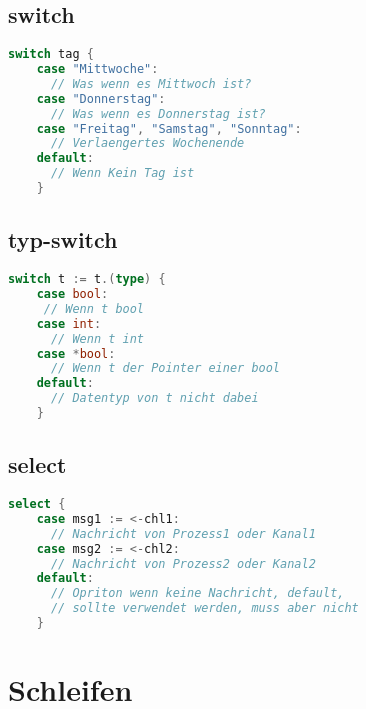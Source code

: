 \documentclass[twoside,a4paper,12pt]{article}
\begin{document}
\subsection{switch}
\begin{center}
  \begin{minipage}{1.0\textwidth}
    \begin{lstlisting}[language=Go]
    switch tag {
    case "Mittwoche":
      // Was wenn es Mittwoch ist? 
    case "Donnerstag":
      // Was wenn es Donnerstag ist?
    case "Freitag", "Samstag", "Sonntag":
      // Verlaengertes Wochenende 
    default:
      // Wenn Kein Tag ist
    }
    \end{lstlisting}
  \end{minipage}
\end{center}

\subsection{typ-switch}
\begin{center}
  \begin{minipage}{1.0\textwidth}
    \begin{lstlisting}[language=Go]
    switch t := t.(type) {
    case bool:
     // Wenn t bool
    case int:
      // Wenn t int 
    case *bool:
      // Wenn t der Pointer einer bool 
    default: 
      // Datentyp von t nicht dabei
    } 
    \end{lstlisting}
  \end{minipage}
\end{center}

\subsection{select}
\begin{center}
  \begin{minipage}{1.0\textwidth}
    \begin{lstlisting}[language=Go]
    select {
    case msg1 := <-chl1:
      // Nachricht von Prozess1 oder Kanal1 
    case msg2 := <-chl2:
      // Nachricht von Prozess2 oder Kanal2
    default:
      // Opriton wenn keine Nachricht, default, 
      // sollte verwendet werden, muss aber nicht
    }
    \end{lstlisting}
  \end{minipage}
\end{center}

\section{Schleifen}
\end{document}
